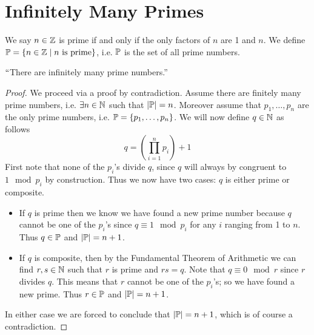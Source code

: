     \section{Infinitely Many Primes}
        \begin{definition}
            We say $n \in \mathbb{Z}$ is prime if and only if the only factors of $n$
            are 1 and $n$. We define $\mathbb{P} = \left\{n \in \mathbb{Z} \mid n \mbox{ is prime}\right\}$,
            i.e. $\mathbb{P}$ is the set of all prime numbers.
        \end{definition}
        \begin{theorem}
            $``$There are infinitely many prime numbers.''
            \label{Infinitely Many Primes}
        \end{theorem}
        \begin{proof}
            We proceed via a proof by contradiction. Assume there are finitely
            many prime numbers, i.e. $\exists n \in \mathbb{N}$ such that $|\mathbb{P}| = n$.
            Moreover assume that $p_1, \dots, p_n$ are the only prime numbers, i.e.
            $\mathbb{P} = \left\{p_1, \dots, p_n\right\}$. We will now define $q \in \mathbb{N}$ as
            follows
            \[
                q = \left(\prod_{i = 1}^n p_i\right) + 1
            \]
            First note that none of the $p_i$'s divide $q$, since $q$ will always by
            congruent to $1 \mod p_i$ by construction. Thus we now have two cases:
            $q$ is either prime or composite.
            \begin{itemize}
                \item
                    If $q$ is prime then we know we have found a new prime number because
                    $q$ cannot be one of the $p_i$'s since $q \equiv 1 \mod p_i$ for any
                    $i$ ranging from 1 to $n$. Thus $q \in \mathbb{P}$ and $|\mathbb{P}| = n + 1$. 
                \item
                    If $q$ is composite, then by the Fundamental Theorem of Arithmetic we
                    can find $r, s \in \mathbb{N}$ such that $r$ is prime and $rs = q$.
                    Note that $q \equiv 0 \mod r$ since $r$ divides $q$. This means
                    that $r$ cannot be one of the $p_i$'s; so we have found a new prime.
                    Thus $r \in \mathbb{P}$ and $|\mathbb{P}| = n + 1$.
            \end{itemize}
            In either case we are forced to conclude that $|\mathbb{P}| = n + 1$, which is of course
            a contradiction. \QED
        \end{proof}
